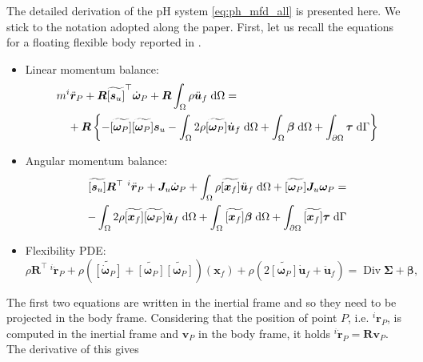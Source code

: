 \documentclass{svjour3}                     %
\DeclareMathOperator*{\Div}{Div}
\newcommand{\crmat}[1]{\ensuremath{\widetilde{\left[#1\right]}}}
\begin{document}
The detailed derivation of the pH system \eqref{eq:ph_mfd_all} is presented here. We stick to the notation adopted along the paper. First, let us recall the equations for a floating flexible body reported in \cite{MB_Daepde,simeon2013computational}.
\begin{itemize}
\item Linear momentum balance:
\begin{equation}
\label{eq:rig_tr3}
\begin{split}
&m ^{i}\ddot{\bm{r}}_P + \bm{R} \crmat{\bm{s}_u}^\top \dot{\bm{\omega}}_P  + \bm{R} \int_{\Omega} \rho \ddot{\bm{u}}_f \d{\Omega} = \\
&\quad + \bm{R} \left\{ -\crmat{\bm{\omega}_P} \crmat{\bm{\omega}_P} \bm{s}_u -  \int_{\Omega} 2 \rho \crmat{\bm{\omega}_P} \dot{\bm{u}}_f \d{\Omega} +  \int_{\Omega} \bm\beta \d{\Omega} +  \int_{\partial \Omega} \bm\tau \d{\Gamma}  \right\} 
\end{split}
\end{equation}
\item Angular momentum balance:
\begin{equation}
\label{eq:rig_rot3}
\begin{split}
\crmat{\bm{s}_u} {\bm{R}^{\top}} \ ^{i}\ddot{\bm{r}}_P + \bm{J}_u \dot{\bm\omega}_P + \int_{\Omega} \rho \crmat{\bm{x}_f} \ddot{\bm{u}}_f \d{\Omega} + \crmat{\bm{\omega}_P} \bm{J}_u \bm{\omega}_P = \\ 
- \int_{\Omega} 2\rho \crmat{\bm{x}_f} \crmat{\bm\omega_P} \dot{\bm{u}}_f \d{\Omega} + \int_{\Omega}\crmat{\bm{x}_f} \bm\beta \d{\Omega} + \int_{\partial \Omega}\crmat{\bm{x}_f} \bm\tau \d{\Gamma} \\
\end{split}
\end{equation}
\item Flexibility PDE:
\begin{equation}
\label{eq:flex3}
\rho  {\bm{R}^{\top}} \ ^{i}\ddot{\bm{r}}_P + \rho (\crmat{\dot{\bm\omega}_P} + \crmat{\bm{\omega}_P}\crmat{\bm{\omega}_P})(\bm{x}_f) + \rho (2 \crmat{\bm{\omega}_P} \dot{\bm{u}}_f + \ddot{\bm{u}}_f) = \Div{\bm\Sigma} + \bm\beta,
\end{equation}
\end{itemize}
The first two equations are written in the inertial frame and so they need to be projected in the body frame. Considering that the position of point $P$, i.e. $^{i}{\bm{r}}_P$, is computed in the inertial frame and $\bm{v}_P$ in the body frame, it holds $^{i}\dot{\bm{r}}_P = \bm{R} \bm{v}_P$. The derivative of this gives
\end{document}
